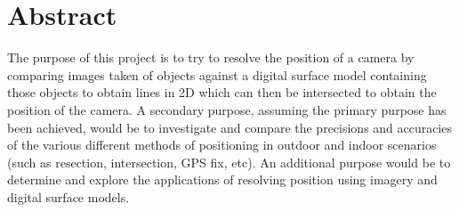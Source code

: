 

\section{Abstract}
The purpose of this project is to try to resolve the position of a camera by comparing images taken of objects against a digital surface model containing those objects to obtain lines in 2D which can then be intersected to obtain the position of the camera. A secondary purpose, assuming the primary purpose has been achieved, would be to investigate and compare the precisions and accuracies of the various different methods of positioning in outdoor and indoor scenarios (such as resection, intersection, GPS fix, etc). An additional purpose would be to determine and explore the applications of resolving position using imagery and digital surface models.
